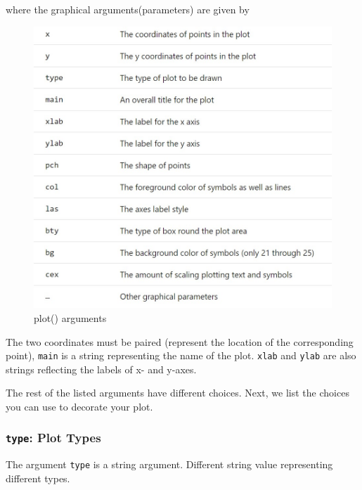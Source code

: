 \documentclass[
]{book}
\begin{document}
where the graphical arguments(parameters) are given by

\begin{figure}

{\centering \includegraphics[width=0.7\linewidth]{img01/w01-plotArguments} 

}

\caption{plot() arguments}\label{fig:unnamed-chunk-4}
\end{figure}

The two coordinates must be paired (represent the location of the corresponding point), \texttt{main} is a string representing the name of the plot. \texttt{xlab} and \texttt{ylab} are also strings reflecting the labels of x- and y-axes.

The rest of the listed arguments have different choices. Next, we list the choices you can use to decorate your plot.

\hypertarget{type-plot-types}{%
\subsubsection{\texorpdfstring{\texttt{type}: Plot Types}{type: Plot Types}}\label{type-plot-types}}

The argument \texttt{type} is a string argument. Different string value representing different types.
\end{document}
